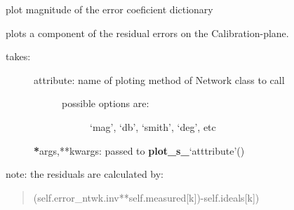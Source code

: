 \documentclass[letterpaper,10pt,english]{sphinxmanual}
\begin{document}
\begin{fulllineitems}
\begin{fulllineitems}
\end{fulllineitems}


\begin{fulllineitems}
\label{api/mwavepy.calibration:mwavepy.calibration.calibration.Calibration.plot_coefs_db}
plot magnitude of the error coeficient dictionary

\end{fulllineitems}


\begin{fulllineitems}
\label{api/mwavepy.calibration:mwavepy.calibration.calibration.Calibration.plot_residuals}
plots a component of the residual errors on the  Calibration-plane.
\begin{description}
\item[{takes:}] \leavevmode\begin{description}
\item[{attribute: name of ploting method of Network class to call}] \leavevmode\begin{description}
\item[{possible options are:}] \leavevmode
`mag', `db', `smith', `deg', etc

\end{description}

\end{description}

{\color{red}\bfseries{}*}args,**kwargs: passed to {\color{red}\bfseries{}plot\_s\_}`atttribute'()

\end{description}

note:
the residuals are calculated by:
\begin{quote}

(self.error\_ntwk.inv**self.measured{[}k{]})-self.ideals{[}k{]})
\end{quote}

\end{fulllineitems}



\end{fulllineitems}
\end{document}
